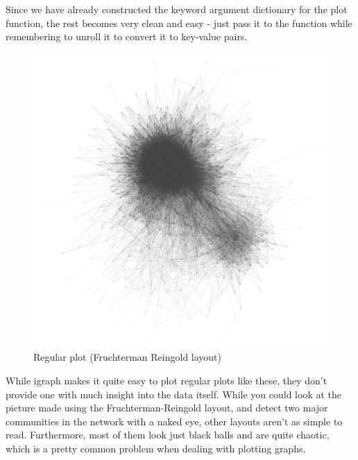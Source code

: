 \documentclass[12pt, a4paper]{article}
\begin{document}


Since we have already constructed the keyword argument dictionary for the plot function, the rest becomes very clean and easy - just pass it to the function while remembering to unroll it to convert it to key-value pairs.


\begin{figure}[hb]
    \centering
    \includegraphics[width=\textwidth]{src/youtube/hdg/hdg_simple}
    \caption{Regular plot (Fruchterman Reingold layout)}
    \label{fig:hdg_simple}
\end{figure}


While igraph makes it quite easy to plot regular plots like these, they don't provide one with much insight into the data itself. While you could look at the picture made using the Fruchterman-Reingold layout, and detect two major communities in the network with a naked eye, other layouts aren't as simple to read. Furthermore, most of them look just black balls and are quite chaotic, which is a pretty common problem when dealing with plotting graphs.
\end{document}
